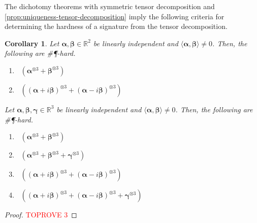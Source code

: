 \documentclass[11pt]{article}
\newtheorem{corollary}[theorem]{Corollary}
\DeclareMathOperator{\holbs}{Holant^*_2}
\DeclareMathOperator{\holts}{Holant^*_3}
\newcommand{\sph}{\#\P-hard\xspace}
\newcommand{\teh}{^{\otimes 3}}
\begin{document}
The dichotomy theorems with symmetric tensor decomposition and \cref{prop:uniqueness-tensor-decomposition} imply the following criteria for determining the hardness of a signature from the tensor decomposition.
\begin{corollary}\label{cor:non-orthogonal-linearly-independent-hard}
  Let $\boldsymbol{\alpha}, \boldsymbol{\beta} \in \mathbb{R}^2$ be linearly independent and $\langle \boldsymbol{\alpha}, \boldsymbol{\beta} \rangle \ne 0$.
  Then, the following are \sph.
  \begin{enumerate}
    \item $\holbs(\boldsymbol{\alpha}\teh + \boldsymbol{\beta}\teh)$
    \item $\holbs( (\boldsymbol{\alpha} + i \boldsymbol{\beta})\teh + (\boldsymbol{\alpha} - i \boldsymbol{\beta})\teh)$
  \end{enumerate}
Let $\boldsymbol{\alpha}, \boldsymbol{\beta}, \boldsymbol{\gamma} \in \mathbb{R}^3$ be linearly independent and $\langle \boldsymbol{\alpha}, \boldsymbol{\beta} \rangle \ne 0$.
Then, the following are \sph.
\begin{enumerate}
\item $\holts(\boldsymbol{\alpha}\teh + \boldsymbol{\beta}\teh)$
  \item $\holts(\boldsymbol{\alpha}\teh + \boldsymbol{\beta}\teh + \boldsymbol{\gamma}\teh)$
  \item $\holts( (\boldsymbol{\alpha} + i \boldsymbol{\beta})\teh + (\boldsymbol{\alpha} - i \boldsymbol{\beta})\teh)$
  \item $\holts( (\boldsymbol{\alpha} + i \boldsymbol{\beta})\teh + (\boldsymbol{\alpha} - i \boldsymbol{\beta})\teh + \boldsymbol{\gamma} \teh)$ 
\end{enumerate}
\end{corollary}
\begin{proof}\textcolor{red}{TOPROVE 3}\end{proof}


 
\end{document}
